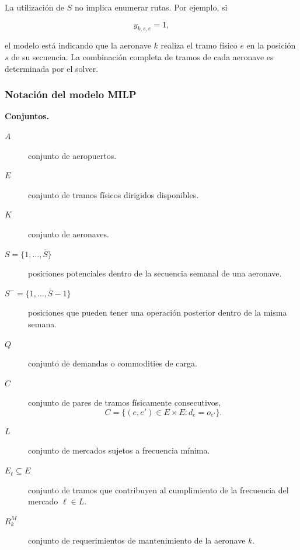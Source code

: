 La utilización de $S$ no implica enumerar rutas. Por ejemplo, si

\[
y_{k,s,e}=1,
\]

el modelo está indicando que la aeronave $k$ realiza el tramo físico $e$ en la posición $s$
de su secuencia. La combinación completa de tramos de cada aeronave es determinada por el
solver.


\subsubsection{Notación del modelo MILP}
\label{app:notacion_milp}

\vspace{0.5em}
\noindent\textbf{Conjuntos.}

\begin{description}

    \item[$A$]
    conjunto de aeropuertos.

    \item[$E$]
    conjunto de tramos físicos dirigidos disponibles.

    \item[$K$]
    conjunto de aeronaves.

    \item[$S=\{1,\ldots,\bar S\}$]
    posiciones potenciales dentro de la secuencia semanal de una aeronave.

    \item[$S^-=\{1,\ldots,\bar S-1\}$]
    posiciones que pueden tener una operación posterior dentro de la misma semana.

    \item[$Q$]
    conjunto de demandas o commodities de carga.

    \item[$C$]
    conjunto de pares de tramos físicamente consecutivos,
    \[
    C=\{(e,e')\in E\times E:d_e=o_{e'}\}.
    \]

    \item[$L$]
    conjunto de mercados sujetos a frecuencia mínima.

    \item[$E_\ell\subseteq E$]
    conjunto de tramos que contribuyen al cumplimiento de la frecuencia del mercado
    $\ell\in L$.

    \item[$R_k^M$]
    conjunto de requerimientos de mantenimiento de la aeronave $k$.

\end{description}


